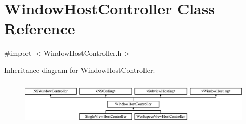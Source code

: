 \hypertarget{interface_window_host_controller}{\section{Window\-Host\-Controller Class Reference}
\label{interface_window_host_controller}
}


{\ttfamily \#import $<$Window\-Host\-Controller.\-h$>$}

Inheritance diagram for Window\-Host\-Controller\-:\begin{figure}[H]
\begin{center}
\leavevmode
\includegraphics[height=2.187500cm]{interface_window_host_controller}
\end{center}
\end{figure}
